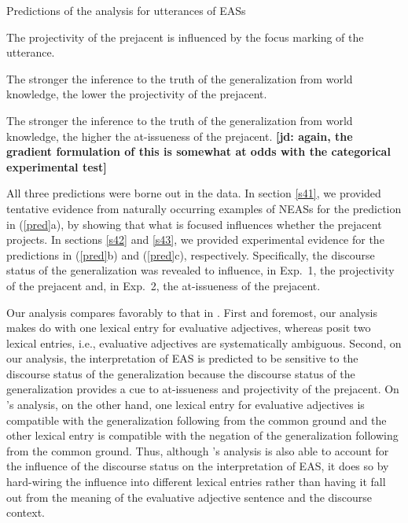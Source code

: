 \documentclass[11pt,fleqn]{article}
\newcommand{\6}{\mbox{$[\hspace*{-.6mm}[$}}
\newcommand{\9}{\mbox{$]\hspace*{-.6mm}]$}}
\newcommand{\citepos}[1]{\citeauthor{#1}'s \citeyear{#1}}
\newcommand{\jd}[1]{\textbf{\color{green}[jd: #1]}}
\begin{document}
\begin{exe}
\exi{(\ref{pred})} Predictions of the analysis for utterances of EASs

\begin{xlist}

\ex The projectivity of the prejacent is influenced by the focus marking of the utterance.

\ex The stronger the inference to the truth of the generalization from world knowledge, the lower the projectivity of the prejacent.

\ex The stronger the inference to the truth of the generalization from world knowledge, the higher the at-issueness of the prejacent. \jd{again, the gradient formulation of this is somewhat at odds with the categorical experimental test}

\end{xlist}
\end{exe}
All three predictions were borne out in the data. In section \ref{s41}, we provided tentative evidence from naturally occurring examples of NEASs for the prediction in (\ref{pred}a), by showing that what is focused influences whether the prejacent projects. In sections \ref{s42} and \ref{s43}, we provided experimental evidence for the predictions in (\ref{pred}b) and (\ref{pred}c), respectively. Specifically, the discourse status of the generalization was revealed to influence, in Exp.~1, the projectivity of the prejacent and, in Exp.~2, the at-issueness of the prejacent. 

Our analysis compares favorably to that in \citealt{karttunen-etal2014}. First and foremost, our analysis makes do with one lexical entry for evaluative adjectives, whereas \citet{karttunen-etal2014} posit two lexical entries, i.e., evaluative adjectives are systematically ambiguous. Second, on our analysis, the interpretation of EAS is predicted to be sensitive to the discourse status of the generalization because the discourse status of the generalization provides a cue to at-issueness and projectivity of the prejacent. On \citepos{karttunen-etal2014} analysis, on the other hand, one lexical entry for evaluative adjectives is compatible with the generalization following from the common ground and the other lexical entry is compatible with the negation of the generalization following from the common ground. Thus, although \citepos{karttunen-etal2014} analysis is also able to account for the influence of the discourse status on the interpretation of EAS, it does so by hard-wiring the influence into  different lexical entries rather than having it fall out from the meaning of the evaluative adjective sentence and the discourse context. 
\end{document}
